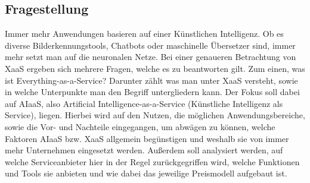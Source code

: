 \subsection{Fragestellung}
Immer mehr Anwendungen basieren auf einer Künstlichen Intelligenz. Ob es diverse Bilderkennungstools, Chatbots oder maschinelle Übersetzer sind, immer mehr setzt man auf die neuronalen Netze.
Bei einer genaueren Betrachtung von XaaS ergeben sich mehrere Fragen, welche es zu beantworten gilt. Zum einen, was ist Everything-as-a-Service? Darunter zählt was man unter XaaS versteht, sowie in welche Unterpunkte man den Begriff untergliedern kann. Der Fokus soll dabei auf AIaaS, also Artificial Intelligence-as-a-Service (Künstliche Intelligenz als Service), liegen. Hierbei wird auf den Nutzen, die möglichen Anwendungsbereiche, sowie die Vor- und Nachteile eingegangen, um abwägen zu können, welche Faktoren AIaaS bzw. XaaS allgemein begünstigen und weshalb sie von immer mehr Unternehmen eingesetzt werden. Außerdem soll analysiert werden, auf welche Serviceanbieter hier in der Regel zurückgegriffen wird, welche Funktionen und Tools sie anbieten und wie dabei das jeweilige Preismodell aufgebaut ist. \\